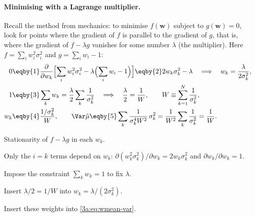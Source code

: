 \paragraph{Minimising with a Lagrange multiplier.}
Recall the method from mechanics: to minimise $f(\bm w)$ subject to
$g(\bm w)=0$, look for points where the gradient of $f$ is parallel to the
gradient of $g$, that is, where the gradient of
$f-\lambda g$ vanishes for some number $\lambda$ (the multiplier). Here
$f=\sum_iw_i^2\sigma_i^2$ and $g=\sum_iw_i-1$:
\begin{align}
  0 &\eqby{1} \frac{\partial}{\partial w_k}\Bigl[\sum_i w_i^2\sigma_i^2-\lambda\Bigl(\sum_iw_i-1\Bigr)\Bigr]
     \eqby{2} 2w_k\sigma_k^2-\lambda
  \quad\Longrightarrow\quad w_k=\frac{\lambda}{2\sigma_k^2},\notag\\
  1 &\eqby{3} \sum_k w_k = \frac{\lambda}{2}\sum_k\frac{1}{\sigma_k^2}
  \quad\Longrightarrow\quad \frac{\lambda}{2}=\frac{1}{W},
  \qquad W\equiv\sum_{k=1}^N\frac{1}{\sigma_k^2},\notag\\
  w_k &\eqby{4} \frac{1/\sigma_k^2}{W},\qquad
  \Var\hat\mu \eqby{5} \sum_k\frac{1}{\sigma_k^4W^2}\,\sigma_k^2
  = \frac{1}{W^2}\sum_k\frac{1}{\sigma_k^2}
  = \frac{1}{W}.
  \label{3a:eq:wmean-weights}
\end{align}
\begin{explain}
  \item Stationarity of $f-\lambda g$ in each $w_k$.
  \item Only the $i=k$ terms depend on $w_k$: $\partial(w_k^2\sigma_k^2)/\partial w_k=2w_k\sigma_k^2$
        and $\partial w_k/\partial w_k=1$.
  \item Impose the constraint $\sum_kw_k=1$ to fix $\lambda$.
  \item Insert $\lambda/2=1/W$ into $w_k=\lambda/(2\sigma_k^2)$.
  \item Insert these weights into \eqref{3a:eq:wmean-var}.
\end{explain}

